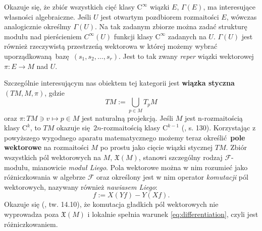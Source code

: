 Okazuje się, że zbiór wszystkich cięć klasy \(\mathrm{C}^\infty\) wiązki \(E\), \(\Gamma(E)\), ma interesujące własności algebraiczne. Jeśli \(U\) jest otwartym pozdbiorem rozmaitości \(E\), wówczas analogicznie określmy \(\Gamma(U)\). Na tak zadanym zbiorze można zadać strukturę modułu nad pierścieniem \(C^\infty(U)\) funkcji klasy \(\mathrm{C}^\infty\) zadanych na \(U\). \(\Gamma(U)\) jest również rzeczywistą przestrzeńą wektorowa w której możemy wybrać uporządkowaną bazę \((s_1, s_2, \dots, s_r)\). Jest to tak zwany \emph{reper} wiązki wektorowej \(\pi:E\to M\) nad \(U\). 



Szczególnie interesującym nas obiektem tej kategorii jest \textbf{wiązka styczna} \((TM, M, \pi)\), gdzie 
\begin{equation*}
TM := \bigcup\limits_{p\in M} T_p M
\end{equation*}
oraz \(\pi: TM \ni v \mapsto p\in M\) jest naturalną projekcją. 
Jeśli \(M\) jest n-rozmaitością klasy \(\mathrm{C}^k\), to \(TM\) okazuje się \(2n\)-rozmaitością klasy \(\mathrm{C}^{k-1}\) (\cite{tu}, s. 130). 
Korzystając z powyższego wygodnego aparatu matematycznego możemy teraz określić \textbf{pole wektorowe} na rozmaitości \(M\) po prostu jako cięcie wiązki stycznej \(TM\). Zbiór wszystkich pól wektorowych na \(M\), \(\mathfrak{X}(M)\), stanowi szczególny rodzaj \(\mathcal{F}\)-modułu, mianowicie \emph{moduł Liego}. Pola wektorowe można w nim rozumieć jako różniczkowania w algebrze \(\mathcal{F}\) oraz określony jest w nim operator \emph{komutacji} pól wektorowych, nazywany również \emph{nawiasem Liego}:
\begin{equation*}
    [X, Y]f := X(Yf) - Y(Xf).
\end{equation*}
Okazuje się (\cite{tu}, tw. 14.10), że komutacja gładkich pól wektorowych nie wyprowadza poza \(\mathfrak{X}(M)\) i lokalnie spełnia warunek \eqref{eq:differentiation}, czyli jest różniczkowaniem.

